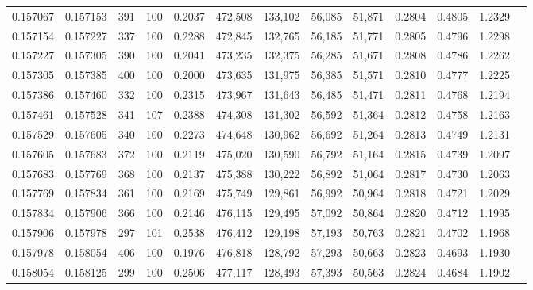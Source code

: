 \begin{tabular}{rrrrrrrrrrrrr}
0.157067 & 0.157153 &   391 & 100 &                                     0.2037 & 472,508 & 133,102 &  56,085 &  51,871 & 0.2804 & 0.4805 & 1.2329 \\
0.157154 & 0.157227 &   337 & 100 &                                     0.2288 & 472,845 & 132,765 &  56,185 &  51,771 & 0.2805 & 0.4796 & 1.2298 \\
0.157227 & 0.157305 &   390 & 100 &                                     0.2041 & 473,235 & 132,375 &  56,285 &  51,671 & 0.2808 & 0.4786 & 1.2262 \\
0.157305 & 0.157385 &   400 & 100 &                                     0.2000 & 473,635 & 131,975 &  56,385 &  51,571 & 0.2810 & 0.4777 & 1.2225 \\
0.157386 & 0.157460 &   332 & 100 &                                     0.2315 & 473,967 & 131,643 &  56,485 &  51,471 & 0.2811 & 0.4768 & 1.2194 \\
0.157461 & 0.157528 &   341 & 107 &                                     0.2388 & 474,308 & 131,302 &  56,592 &  51,364 & 0.2812 & 0.4758 & 1.2163 \\
0.157529 & 0.157605 &   340 & 100 &                                     0.2273 & 474,648 & 130,962 &  56,692 &  51,264 & 0.2813 & 0.4749 & 1.2131 \\
0.157605 & 0.157683 &   372 & 100 &                                     0.2119 & 475,020 & 130,590 &  56,792 &  51,164 & 0.2815 & 0.4739 & 1.2097 \\
0.157683 & 0.157769 &   368 & 100 &                                     0.2137 & 475,388 & 130,222 &  56,892 &  51,064 & 0.2817 & 0.4730 & 1.2063 \\
0.157769 & 0.157834 &   361 & 100 &                                     0.2169 & 475,749 & 129,861 &  56,992 &  50,964 & 0.2818 & 0.4721 & 1.2029 \\
0.157834 & 0.157906 &   366 & 100 &                                     0.2146 & 476,115 & 129,495 &  57,092 &  50,864 & 0.2820 & 0.4712 & 1.1995 \\
0.157906 & 0.157978 &   297 & 101 &                                     0.2538 & 476,412 & 129,198 &  57,193 &  50,763 & 0.2821 & 0.4702 & 1.1968 \\
0.157978 & 0.158054 &   406 & 100 &                                     0.1976 & 476,818 & 128,792 &  57,293 &  50,663 & 0.2823 & 0.4693 & 1.1930 \\
0.158054 & 0.158125 &   299 & 100 &                                     0.2506 & 477,117 & 128,493 &  57,393 &  50,563 & 0.2824 & 0.4684 & 1.1902 \\

\end{tabular}
